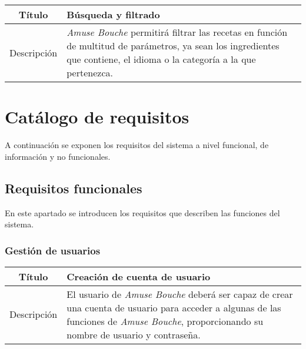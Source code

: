 \begin{center}
  
  \begin{tabularx}{\textwidth}{|c|X|}
    \hline
    Título & Búsqueda y filtrado \\

    \hline

    Descripción & \textit{Amuse Bouche} permitirá filtrar las recetas en función
    de multitud de parámetros, ya sean los ingredientes que contiene, el idioma o
    la categoría a la que pertenezca.\\

    \hline
  \end{tabularx}
\end{center}

\section{Catálogo de requisitos}

A continuación se exponen los requisitos del sistema a nivel funcional, de
información y no funcionales.

\subsection{Requisitos funcionales}

En este apartado se introducen los requisitos que describen las funciones del
sistema.

\subsubsection{Gestión de usuarios}

\begin{center}
  
  \begin{tabularx}{\textwidth}{|c|X|}
    \hline
    Título & Creación de cuenta de usuario \\

    \hline

    Descripción & El usuario de \textit{Amuse Bouche} deberá ser capaz de crear
    una cuenta de usuario para acceder a algunas de las funciones de
    \textit{Amuse Bouche}, proporcionando su nombre de usuario y contraseña.\\

    \hline
  \end{tabularx}
\end{center}


